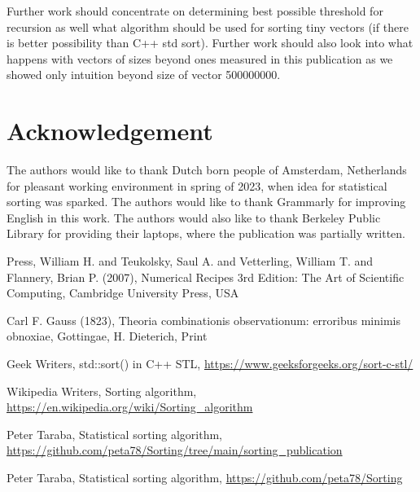 \documentclass[12pt]{article}
\begin{document}
	Further work should concentrate on determining best possible threshold for recursion as well what algorithm should be used for sorting tiny vectors (if there is better possibility than C++ std sort). Further work should also look into what happens with vectors of sizes beyond ones measured in this publication as we showed only intuition beyond size of vector 500000000.
	
	\section*{Acknowledgement}
	
	The authors would like to thank Dutch born people of Amsterdam, Netherlands for pleasant working environment in spring of 2023, when idea for statistical sorting was sparked. The authors would like to thank Grammarly for improving English in this work. The authors would also like to thank Berkeley Public Library for providing their laptops, where the publication was partially written.
	
\begin{thebibliography}{9}
Press, William H. and Teukolsky, Saul A. and Vetterling, William T. and Flannery, Brian P. (2007), Numerical Recipes 3rd Edition: The Art of Scientific Computing, Cambridge University Press, USA

Carl F. Gauss (1823), Theoria combinationis observationum: erroribus minimis obnoxiae, Gottingae, H. Dieterich, Print

Geek Writers, std::sort() in C++ STL, \url{https://www.geeksforgeeks.org/sort-c-stl/}

Wikipedia Writers, Sorting algorithm, \url{https://en.wikipedia.org/wiki/Sorting_algorithm}

Peter Taraba, Statistical sorting algorithm, \url{https://github.com/peta78/Sorting/tree/main/sorting_publication}

Peter Taraba, Statistical sorting algorithm, \url{https://github.com/peta78/Sorting}

\end{thebibliography}

	
	
\end{document}
